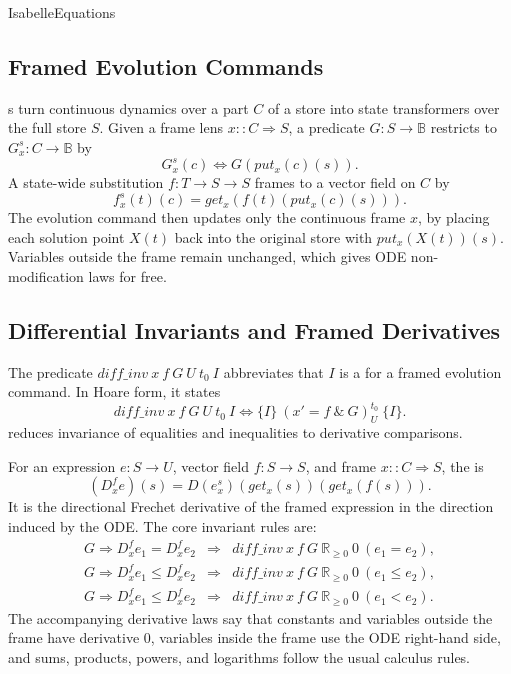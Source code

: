 \documentclass[hidelinks]{article}
\begin{document}
\begin{smodule}[title={IsaVODEs: Interactive Verification of Cyber-Physical Systems at Scale}]{IsabelleEquations}
\subsection{Framed Evolution Commands}

s turn continuous dynamics over a part \(C\) of a store into state transformers over the full store \(S\).
Given a frame lens \(x::C\Rightarrow S\), a predicate \(G:S\to\mathbb{B}\) restricts to \(G^s_x:C\to\mathbb{B}\) by
\[
    G^s_x(c) \Longleftrightarrow G(put_x(c)(s)).
\]
A state-wide substitution \(f:T\to S\to S\) frames to a vector field on \(C\) by
\[
    f^s_x(t)(c)=get_x(f(t)(put_x(c)(s))).
\]
The evolution command then updates only the continuous frame \(x\), by placing each solution point \(X(t)\) back into the original store with \(put_x(X(t))(s)\).
Variables outside the frame remain unchanged, which gives ODE non-modification laws for free.

\subsection{Differential Invariants and Framed Derivatives}

The predicate \(diff\_inv\ x\ f\ G\ U\ t_0\ I\) abbreviates that \(I\) is a  for a framed evolution command.
In Hoare form, it states
\[
    diff\_inv\ x\ f\ G\ U\ t_0\ I
    \Longleftrightarrow
    \{I\}\ (x'=f\ \&\ G)^ {t_0}_U\ \{I\}.
\]
 reduces invariance of equalities and inequalities to derivative comparisons.

For an expression \(e:S\to U\), vector field \(f:S\to S\), and frame \(x::C\Rightarrow S\), the  is
\[
    (D^f_x e)(s)
    =
    D(e^s_x)(get_x(s))(get_x(f(s))).
\]
It is the directional Frechet derivative of the framed expression in the direction induced by the ODE.
The core invariant rules are:
\[
\begin{array}{rcl}
G\Longrightarrow D^f_x e_1=D^f_x e_2
&\Longrightarrow&
diff\_inv\ x\ f\ G\ \mathbb{R}_{\geq 0}\ 0\ (e_1=e_2),\\
G\Longrightarrow D^f_x e_1\leq D^f_x e_2
&\Longrightarrow&
diff\_inv\ x\ f\ G\ \mathbb{R}_{\geq 0}\ 0\ (e_1\leq e_2),\\
G\Longrightarrow D^f_x e_1\leq D^f_x e_2
&\Longrightarrow&
diff\_inv\ x\ f\ G\ \mathbb{R}_{\geq 0}\ 0\ (e_1<e_2).
\end{array}
\]
The accompanying derivative laws say that constants and variables outside the frame have derivative \(0\), variables inside the frame use the ODE right-hand side, and sums, products, powers, and logarithms follow the usual calculus rules.


\end{smodule}
\end{document}
